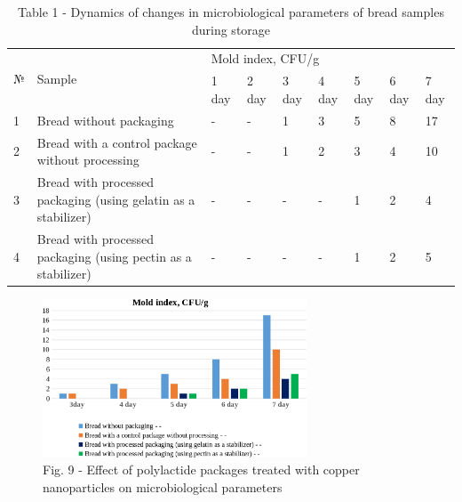 \begin{table}[H]
\caption*{Table 1 - Dynamics of changes in microbiological parameters of bread samples during storage}
\centering
\begin{tabular}{|l|p{}|lllllll|}
\hline
\multirow{2}{*}{№} & \multirow{2}{*}{Sample} & \multicolumn{7}{l|}{Mold 			index, CFU/g} \\ \cline{3-9} 
 &  & \multicolumn{1}{l|}{1 			day} & \multicolumn{1}{l|}{2 			day} & \multicolumn{1}{l|}{3 			day} & \multicolumn{1}{l|}{4 			day} & \multicolumn{1}{l|}{5 			day} & \multicolumn{1}{l|}{6 			day} & 7 			day \\ \hline
1 & Bread 			without packaging & \multicolumn{1}{l|}{-} & \multicolumn{1}{l|}{-} & \multicolumn{1}{l|}{1} & \multicolumn{1}{l|}{3} & \multicolumn{1}{l|}{5} & \multicolumn{1}{l|}{8} & 17 \\ \hline
2 & Bread 			with a control package without processing & \multicolumn{1}{l|}{-} & \multicolumn{1}{l|}{-} & \multicolumn{1}{l|}{1} & \multicolumn{1}{l|}{2} & \multicolumn{1}{l|}{3} & \multicolumn{1}{l|}{4} & 10 \\ \hline
3 & Bread 			with processed packaging (using gelatin as a stabilizer) & \multicolumn{1}{l|}{-} & \multicolumn{1}{l|}{-} & \multicolumn{1}{l|}{-} & \multicolumn{1}{l|}{-} & \multicolumn{1}{l|}{1} & \multicolumn{1}{l|}{2} & 4 \\ \hline
4 & Bread 			with processed packaging (using pectin as a stabilizer) & \multicolumn{1}{l|}{-} & \multicolumn{1}{l|}{-} & \multicolumn{1}{l|}{-} & \multicolumn{1}{l|}{-} & \multicolumn{1}{l|}{1} & \multicolumn{1}{l|}{2} & 5 \\ \hline
\end{tabular}
\end{table}

\begin{figure}[H]
	\centering
	\includegraphics[width=0.7\textwidth]{assets/22.1}
	\caption*{Fig. 9 - Effect of polylactide packages treated with copper nanoparticles on microbiological parameters}
\end{figure}

